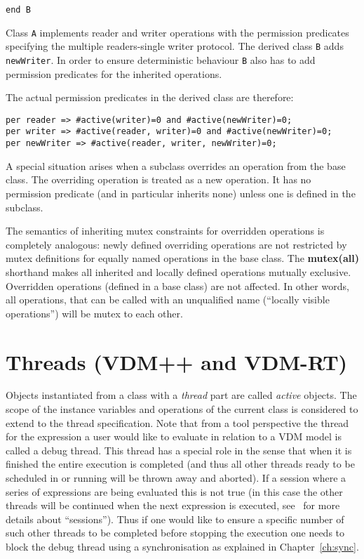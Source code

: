 \documentclass{overturerepchap}
\newcommand{\keyw}[1]{{\bf\ttfamily #1}}
\begin{document}
{\begin{lstlisting}
end B
\end{lstlisting}

Class \texttt{A} implements reader and writer operations with the permission
predicates specifying the multiple readers-single writer protocol. The
derived class \texttt{B} adds \texttt{newWriter}. In order to ensure
deterministic behaviour \texttt{B} also has to add permission
predicates for the inherited operations.

The actual permission predicates in the derived class
are therefore:
\begin{lstlisting}
per reader => #active(writer)=0 and #active(newWriter)=0;
per writer => #active(reader, writer)=0 and #active(newWriter)=0;
per newWriter => #active(reader, writer, newWriter)=0;
\end{lstlisting}

A special situation arises when a subclass overrides an
operation from the base class. The overriding operation is
treated as a new operation.  It has no permission predicate (and in
particular inherits none) unless one is defined in the subclass.

The semantics of inheriting mutex constraints for overridden
operations is completely analogous: newly defined overriding
operations are not restricted by mutex definitions for equally named
operations in the base class. The \keyw{mutex(all)} shorthand makes all
inherited and locally defined operations mutually
exclusive. Overridden operations (defined in a base class) are not
affected. In other words, all operations, that can be called with an
unqualified name (``locally visible operations'') will be mutex to
each other.

\chapter{Threads (VDM++ and VDM-RT)}\label{ch:thread}

Objects instantiated from a class with a {\em thread} part are called
{\em active} objects.  The scope of the instance variables and
operations of the current class is considered to extend to the thread
specification. Note that from a tool perspective the thread for the
expression a user would like to evaluate in relation to a VDM model is
called a debug thread. This thread has a special role in the sense
that when it is finished the entire execution is completed (and thus
all other threads ready to be scheduled in or running will be thrown
away and aborted). If a session where a series of expressions are
being evaluated this is not true (in this case the other threads will
be continued when the next expression is executed,
see~\cite{Larsen&13a} for more details about ``sessions'').
Thus if one would like to ensure a specific number
of such other threads to be completed before stopping the execution
one needs to block the debug thread using a synchronisation as
explained in Chapter~\ref{ch:sync}.

}
\end{document}
